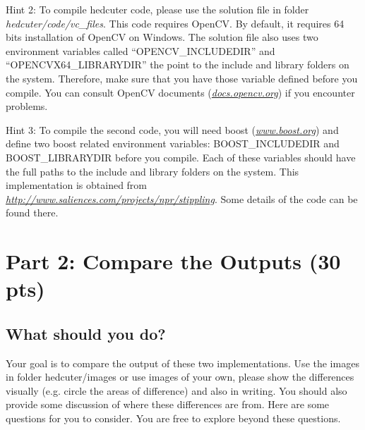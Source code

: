 \documentclass[11pt]{article}
\begin{document}
{\sc Hint 2}: To compile hedcuter code, please use the solution file in folder {\em hedcuter/code/vc\_files}.
 This code requires OpenCV. By default, it requires 64 bits installation of OpenCV on Windows. 
The solution file also uses two environment variables called ``OPENCV\_INCLUDEDIR'' and ``OPENCVX64\_LIBRARYDIR'' the point to 
the include and library folders on the system. Therefore, make sure that you have those variable defined before you compile. You can  consult OpenCV documents
(\href{docs.opencv.org}{\it docs.opencv.org}) if you encounter problems. 

{\sc Hint 3}: To compile the second code, you will need boost (\href{www.boost.org}{\it www.boost.org}) and define two boost related environment variables:
BOOST\_INCLUDEDIR and BOOST\_LIBRARYDIR before you compile. Each of these variables should have the full paths to the include and library folders on the system.
This implementation is obtained from  \href{http://www.saliences.com/projects/npr/stippling}{\it http://www.saliences.com/projects/npr/stippling}.
Some details of the code can be found there.



\section{Part 2: Compare the Outputs  (30 pts)}






\subsection{What should  you do?}

Your goal is to compare the output of these two implementations. 
Use the images in folder hedcuter/images or use images of your own, please show the differences visually (e.g. circle the areas of difference)
and also in writing. 
You should also provide some discussion of where these differences are from.  Here are some questions for you to consider.
You are free to explore beyond these questions. 
\end{document}
